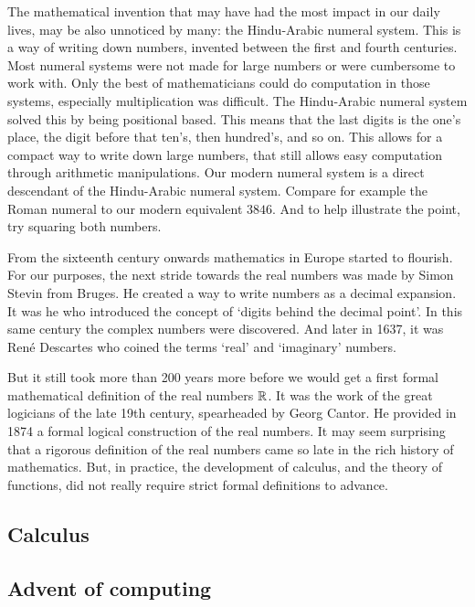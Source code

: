 The mathematical invention that may have had the most impact in our daily lives, may be also unnoticed by many: the Hindu-Arabic numeral system. This is a way of writing down numbers, invented between the first and fourth centuries. Most numeral systems were not made for large numbers or were cumbersome to work with. Only the best of mathematicians could do computation in those systems, especially multiplication was difficult. The Hindu-Arabic numeral system solved this by being positional based. This means that the last digits is the one's place, the digit before that ten's, then hundred's, and so on. This allows for a compact way to write down large numbers, that still allows easy computation through arithmetic manipulations. Our modern numeral system is a direct descendant of the Hindu-Arabic numeral system. Compare for example the Roman numeral \uppercase\expandafter{\relax} to our modern equivalent $3846$. And to help illustrate the point, try squaring both numbers.

From the sixteenth century onwards mathematics in Europe started to flourish. For our purposes, the next stride towards the real numbers was made by Simon Stevin from Bruges. He created a way to write numbers as a decimal expansion. It was he who introduced the concept of `digits behind the decimal point'. In this same century the complex numbers were discovered. And later in 1637, it was René Descartes who coined the terms `real' and `imaginary' numbers.

But it still took more than 200 years more before we would get a first formal mathematical definition of the real numbers $\mathbb{R}$. It was the work of the great logicians of the late 19th century, spearheaded by Georg Cantor. He provided in 1874 a formal logical construction of the real numbers. It may seem surprising that a rigorous definition of the real numbers came so late in the rich history of mathematics. But, in practice, the development of calculus, and the theory of functions, did not really require strict formal definitions to advance.


\subsection{Calculus}




\subsection{Advent of computing}

